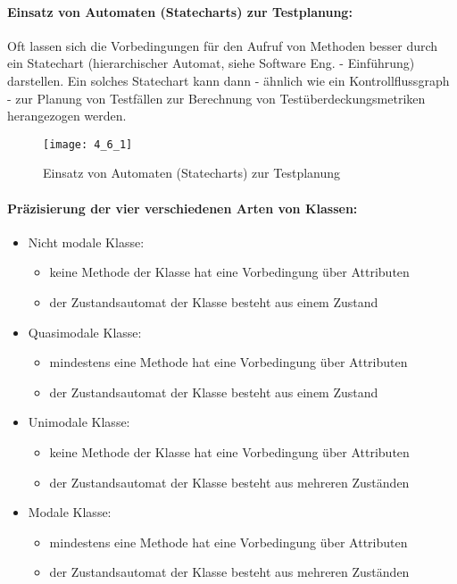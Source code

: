 \paragraph{Einsatz von Automaten (Statecharts) zur Testplanung:}

Oft lassen sich die Vorbedingungen für den Aufruf von Methoden besser durch ein Statechart (hierarchischer Automat, siehe Software Eng. - Einführung) darstellen. Ein solches Statechart kann dann - ähnlich wie ein Kontrollflussgraph - zur Planung von Testfällen zur Berechnung von Testüberdeckungsmetriken herangezogen werden.

\begin{figure}[h]
	\centering
	\caption{Einsatz von Automaten (Statecharts) zur Testplanung}
	\texttt{[image: 4\_6\_1]}
\end{figure}

\paragraph{Präzisierung der vier verschiedenen Arten von Klassen:}
\begin{itemize}
	\item Nicht modale Klasse:
	\begin{itemize}
		\item keine Methode der Klasse hat eine Vorbedingung über Attributen
		\item der Zustandsautomat der Klasse besteht aus einem Zustand
	\end{itemize}
	\item Quasimodale Klasse:
	\begin{itemize}
		\item mindestens eine Methode hat eine Vorbedingung über Attributen
		\item der Zustandsautomat der Klasse besteht aus einem Zustand
	\end{itemize}
	\item Unimodale Klasse:
	\begin{itemize}
		\item keine Methode der Klasse hat eine Vorbedingung über Attributen
		\item der Zustandsautomat der Klasse besteht aus mehreren Zuständen
	\end{itemize}
	\item Modale Klasse:
	\begin{itemize}
		\item mindestens eine Methode hat eine Vorbedingung über Attributen
		\item der Zustandsautomat der Klasse besteht aus mehreren Zuständen
	\end{itemize}
\end{itemize}

